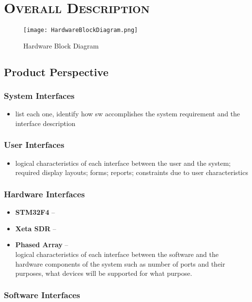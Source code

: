\documentclass[ProjectRequirements.tex]{subfiles}
\begin{document}
\bigskip

\section{\textsc{\Large Overall Description}}
	\begin{figure}[H]
		\centering
		\texttt{[image: HardwareBlockDiagram.png]}
		\caption{Hardware Block Diagram \label{fig:HardwareBlockDiagram}}
	\end{figure}
	\subsection{Product Perspective}
	
		\subsubsection{System Interfaces}
			\begin{itemize}\itemsep1pt
				\item list each one, identify how sw accomplishes the system requirement and the interface description
			\end{itemize}	
		\subsubsection{User Interfaces}
			\begin{itemize}\itemsep1pt
				\item logical characteristics of each interface between the user and the system; required display layouts; forms; reports; constraints due to user characteristics
			\end{itemize}
		\subsubsection{Hardware Interfaces}
			\begin{itemize}\itemsep1pt
				\item \textbf{STM32F4} -- 
				\item \textbf{Xeta SDR} -- 
				\item \textbf{Phased Array} -- \\
				logical characteristics of each interface between the software and the hardware components of the system such as number of ports and their purposes, what devices will be supported for what purpose.
			\end{itemize}
		\subsubsection{Software Interfaces}
			
\end{document}
